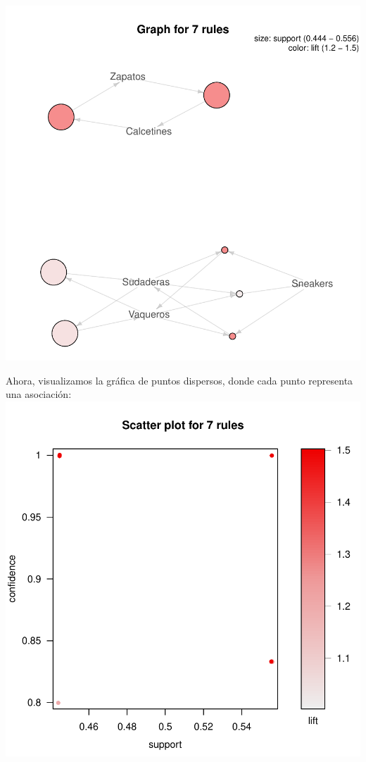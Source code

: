 \documentclass [a4paper] {article}
\begin{document}
\includegraphics{Memoria-Figura 5}

Ahora, visualizamos la gráfica de puntos dispersos, donde 
cada punto representa una asociación:
\newline
\includegraphics{Memoria-Figura 6}
\end{document}
